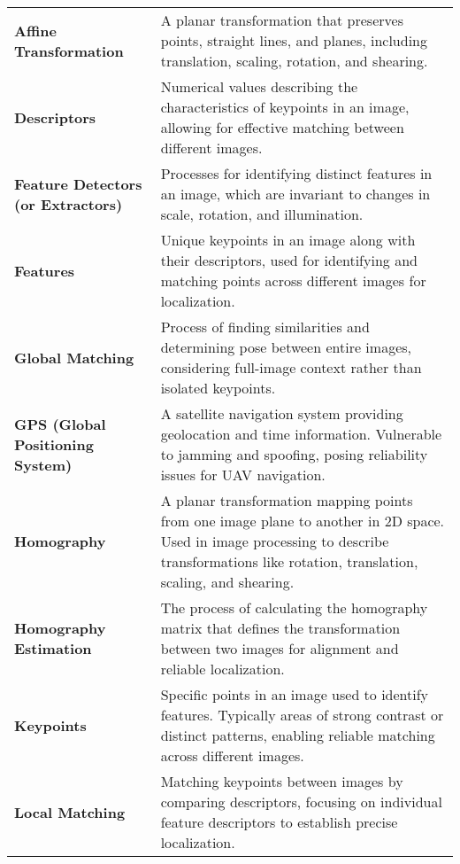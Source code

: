 \begingroup
\renewcommand{\arraystretch}{1.2}
\begin{tabularx}{\textwidth}{@{}p{2.5cm}L}

    \textbf{Affine Transformation} & 
    A planar transformation that preserves points, straight lines, and planes, including translation, scaling, rotation, and shearing. \\

    \textbf{Descriptors} & 
    Numerical values describing the characteristics of keypoints in an image, allowing for effective matching between different images. \\

    \textbf{Feature Detectors (or Extractors)} & 
    Processes for identifying distinct features in an image, which are invariant to changes in scale, rotation, and illumination. \\

    \textbf{Features} & 
    Unique keypoints in an image along with their descriptors, used for identifying and matching points across different images for localization. \\

    \textbf{Global Matching} & 
    Process of finding similarities and determining pose between entire images, considering full-image context rather than isolated keypoints. \\

    \textbf{GPS (Global Positioning System)} & 
    A satellite navigation system providing geolocation and time information. Vulnerable to jamming and spoofing, posing reliability issues for UAV navigation. \\

    \textbf{Homography} & 
    A planar transformation mapping points from one image plane to another in 2D space. Used in image processing to describe transformations like rotation, translation, scaling, and shearing. \\

    \textbf{Homography Estimation} & 
    The process of calculating the homography matrix that defines the transformation between two images for alignment and reliable localization. \\

    \textbf{Keypoints} & 
    Specific points in an image used to identify features. Typically areas of strong contrast or distinct patterns, enabling reliable matching across different images. \\

    \textbf{Local Matching} & 
    Matching keypoints between images by comparing descriptors, focusing on individual feature descriptors to establish precise localization. \\


\end{tabularx}
